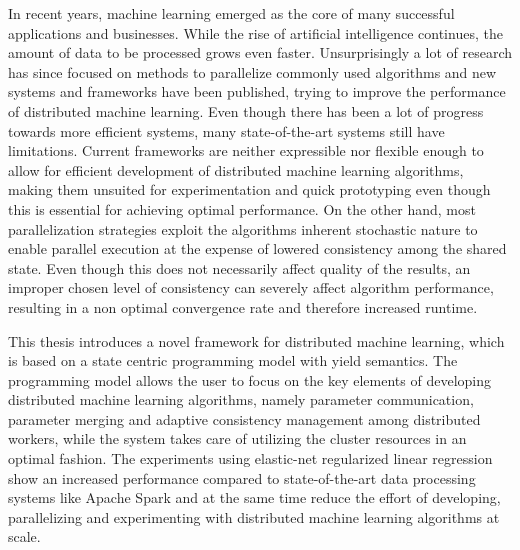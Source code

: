 % 
% 
%
In recent years, machine learning emerged as the core of many successful applications and businesses.
While the rise of artificial intelligence continues, the amount of data to be processed grows even faster.
Unsurprisingly a lot of research has since focused on methods to parallelize commonly used algorithms and new systems and frameworks have been published, trying to improve the performance of distributed machine learning.
Even though there has been a lot of progress towards more efficient systems, many state-of-the-art systems still have limitations.
Current frameworks are neither expressible nor flexible enough to allow for efficient development of distributed machine learning algorithms, making them unsuited for experimentation and quick prototyping even though this is essential for achieving optimal performance.
On the other hand, most parallelization strategies exploit the algorithms inherent stochastic nature to enable parallel execution at the expense of lowered consistency among the shared state.
Even though this does not necessarily affect quality of the results, an improper chosen level of consistency can severely affect algorithm performance, resulting in a non optimal convergence rate and therefore increased runtime.

This thesis introduces a novel framework for distributed machine learning, which is based on a state centric programming model with yield semantics.
The programming model allows the user to focus on the key elements of developing distributed machine learning algorithms, namely parameter communication, parameter merging and adaptive consistency management among distributed workers, while the system takes care of utilizing the cluster resources in an optimal fashion.
The experiments using elastic-net regularized linear regression show an increased performance compared to state-of-the-art data processing systems like Apache Spark and at the same time reduce the effort of developing, parallelizing and experimenting with distributed machine learning algorithms at scale.
